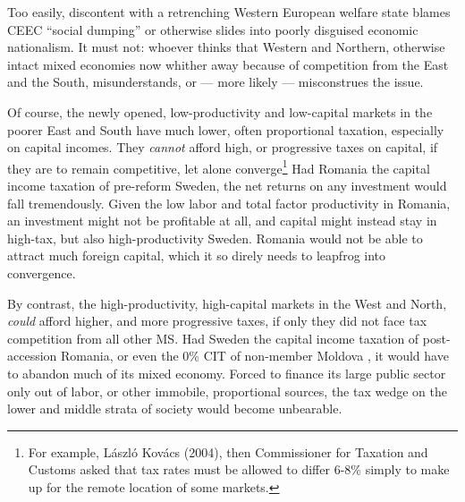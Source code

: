 \documentclass[11pt,a4paper,oneside,openright]{article}
\begin{document}




Too easily, discontent with a retrenching Western European welfare state blames \gls{CEEC} ``social dumping'' %
or otherwise slides into poorly disguised economic nationalism. 
It must not: 
whoever thinks that Western and Northern, otherwise intact mixed economies now whither away because of competition from the East and the South, misunderstands, or --- more likely --- misconstrues the issue.

Of course, the newly opened, low-productivity and low-capital markets in the poorer East and South have much lower, often proportional taxation, especially on capital incomes. 
They \emph{cannot} afford high, or progressive taxes on capital, if they are to remain competitive, let alone converge\footnote{
	For example, L\'{a}szl\'{o} Kov\'{a}cs (2004), then Commissioner for Taxation and Customs asked that tax rates must be allowed to differ 6-8\% simply to make up for the remote location of some markets.} 
Had Romania the capital income taxation of pre-reform Sweden, the net returns on any investment would fall tremendously. 
Given the low labor and total factor productivity in Romania, an investment might not be profitable at all, and capital might instead stay in high-tax, but also high-productivity Sweden. 
Romania would not be able to attract much foreign capital, which it so direly needs to leapfrog into convergence.
	
By contrast, the high-productivity, high-capital markets in the West and North, \emph{could} afford higher, and more progressive taxes, if only they did not face tax competition from all other \gls{MS}. 
Had Sweden the capital income taxation of post-accession Romania, or even the 0\% \gls{CIT} of non-member Moldova \citep{Piatkowski2008}, it would have to abandon much of its mixed economy. 
Forced to finance its large public sector only out of labor, or other immobile, proportional sources, the tax wedge on the lower and middle strata of society would become unbearable. 
\end{document}
